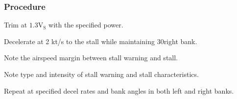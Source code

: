 % 
% 
%
 \subsubsection*{Procedure}
 \begin{compactenum}
   \item Trim at $\mathrm{1.3V_{S}}$ with the specified power.
   \item Decelerate at 2 kt/s to the stall while maintaining 30\textdegree right bank.
   \item Note the airspeed margin between stall warning and stall.
   \item Note type and intensity of stall warning and stall characteristics.
   \item Repeat at specified decel rates and bank angles in both left and right banks.
   \end{compactenum}